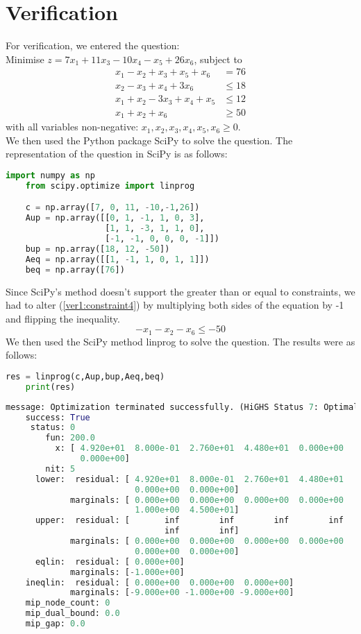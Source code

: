\documentclass{article}
\numberwithin{equation}{section}
\begin{document}
\section{Verification}
For verification, we entered the question: \\
Minimise $z = 7x_1 + 11x_3 - 10x_4 - x_5 + 26x_6$, subject to
\begin{align}
    x_1 - x_2 + x_3 + x_5 + x_6 &= 76 \label{ver1:constraint1} \\
    x_2 - x_3 + x_4 + 3x_6 &\leq 18 \label{ver1:constraint2} \\
    x_1 + x_2 - 3x_3 + x_4 + x_5 &\leq 12 \label{ver1:constraint3} \\
    x_1 + x_2 + x_6 &\geq 50 \label{ver1:constraint4}
\end{align}
with all variables non-negative: $x_1, x_2, x_3, x_4, x_5, x_6 \geq 0$. \\
We then used the Python package SciPy to solve the question. The representation of the question in SciPy is as follows:
\begin{lstlisting}[language=Python, basicstyle=\scriptsize, frame=single]
    import numpy as np
    from scipy.optimize import linprog

    c = np.array([7, 0, 11, -10,-1,26])
    Aup = np.array([[0, 1, -1, 1, 0, 3],
                    [1, 1, -3, 1, 1, 0],
                    [-1, -1, 0, 0, 0, -1]])
    bup = np.array([18, 12, -50])
    Aeq = np.array([[1, -1, 1, 0, 1, 1]])
    beq = np.array([76])
\end{lstlisting}
Since SciPy's method doesn't support the greater than or equal to constraints, we had to alter (\ref{ver1:constraint4}) by multiplying both sides of the equation by -1 and flipping the inequality. 
\begin{equation}
    -x_1 - x_2 - x_6 \leq -50
\end{equation}
We then used the SciPy method linprog to solve the question. The results were as follows:
\begin{lstlisting}[language=Python, basicstyle=\scriptsize, frame=single]
    res = linprog(c,Aup,bup,Aeq,beq)
    print(res)
\end{lstlisting}
\begin{lstlisting}[language=Python, basicstyle=\scriptsize]
    message: Optimization terminated successfully. (HiGHS Status 7: Optimal)
    success: True
     status: 0
        fun: 200.0
          x: [ 4.920e+01  8.000e-01  2.760e+01  4.480e+01  0.000e+00
               0.000e+00]
        nit: 5
      lower:  residual: [ 4.920e+01  8.000e-01  2.760e+01  4.480e+01
                          0.000e+00  0.000e+00]
             marginals: [ 0.000e+00  0.000e+00  0.000e+00  0.000e+00
                          1.000e+00  4.500e+01]
      upper:  residual: [       inf        inf        inf        inf
                                inf        inf]
             marginals: [ 0.000e+00  0.000e+00  0.000e+00  0.000e+00
                          0.000e+00  0.000e+00]
      eqlin:  residual: [ 0.000e+00]
             marginals: [-1.000e+00]
    ineqlin:  residual: [ 0.000e+00  0.000e+00  0.000e+00]
             marginals: [-9.000e+00 -1.000e+00 -9.000e+00]
    mip_node_count: 0
    mip_dual_bound: 0.0
    mip_gap: 0.0
\end{lstlisting}
\end{document}
